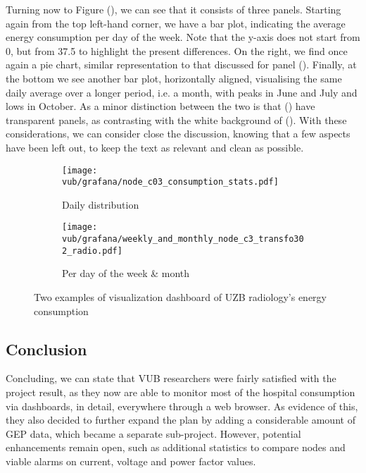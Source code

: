 Turning now to Figure (), we can see that it consists of three panels. Starting again from the top left-hand corner, 
we have a bar plot, indicating the average energy consumption per day of the week. %
Note that the y-axis does not start from 0, but from 37.5 to highlight the present differences. 
On the right, we find once again a pie chart, similar representation to that discussed for panel ().
Finally, at the bottom we see another bar plot, horizontally aligned, visualising the same daily average over a longer period, i.e. a month, with peaks in June and July and lows in October. 
As a minor distinction between the two is that () have transparent panels, as contrasting with the white background of (). 
With these considerations,  we can consider close the discussion, knowing that a few aspects have been left out, to keep the text as relevant and clean as possible.

\begin{figure}
    \begin{subfigure}{\textwidth}
        \texttt{[image: vub/grafana/node\_c03\_consumption\_stats.pdf]}
        \caption{Daily distribution}
        \label{fig:vub_stats_v1}
    \end{subfigure}
    \begin{subfigure}{\textwidth}
        \texttt{[image: vub/grafana/weekly\_and\_monthly\_node\_c3\_transfo302\_radio.pdf]}
        \caption{Per day of the week \& month}
        \label{fig:vub_stats_v2}
    \end{subfigure}
    \caption{Two examples of visualization dashboard of \acs{UZB} radiology's energy consumption}
    \label{fig:vub_2_dashboard}
\end{figure}

\subsection{Conclusion}
Concluding, we can state that \ac{VUB} researchers were fairly satisfied with the project result, as they now are able to monitor most of the hospital consumption via dashboards, in detail, everywhere through a web browser.
As evidence of this, they also decided to further expand the plan by adding a considerable amount of \ac{GEP} data, which became a separate sub-project.
However, potential enhancements remain open, such as additional statistics to compare nodes and viable alarms on current, voltage and power factor values. 


